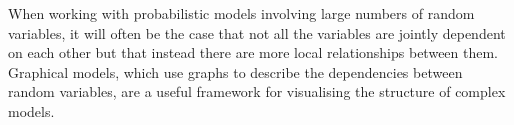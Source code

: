When working with probabilistic models involving large numbers of random variables, it will often be the case that not all the variables are jointly dependent on each other but that instead there are more local  relationships between them. Graphical models, which use graphs to describe the dependencies between random variables, are a useful framework for visualising the structure of complex models.

